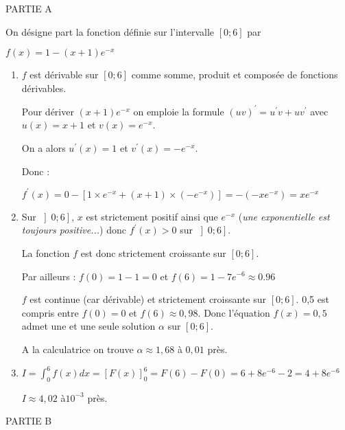\begin{corrige}
     \begin{h3}PARTIE A\end{h3}
     On désigne part la fonction définie sur l'intervalle $\left[0 ; 6\right]$ par
     \par
     $f\left(x\right)=1-\left(x+1\right)e^{- x}$
     \begin{enumerate}
          \item
          $f$ est dérivable sur $\left[0;6\right]$ comme somme, produit et composée de fonctions dérivables.
          \par
          Pour dériver $\left(x+1\right)e^{- x}$ on emploie la formule $\left(uv\right)^{\prime}=u^{\prime}v+uv^{\prime}$ avec $u\left(x\right)=x+1$ et $v\left(x\right)=e^{-x}$.
          \par
          On a alors $u^{\prime}\left(x\right)=1$ et $v^{\prime}\left(x\right)=-e^{-x}$.
          \par
          Donc :
          \par
          $f^{\prime}\left(x\right)=0-\left[1\times e^{-x}+\left(x+1\right)\times \left(-e^{-x}\right)\right]=-\left(-xe^{-x}\right)=xe^{-x}$
          \item
          Sur $\left]0;6\right]$, $x$ est strictement positif ainsi que $e^{-x}$ (\textit{une exponentielle est toujours positive...}) donc $f^{\prime}\left(x\right) > 0$ sur $\left]0;6\right]$.
          \par
          La fonction $f$ est donc strictement croissante sur $\left[0;6\right]$.
          \par
          Par ailleurs : $f\left(0\right)=1-1=0$ et $f\left(6\right)=1-7e^{-6} \approx 0.96$
          \par
          $f$ est continue (car dérivable) et strictement croissante sur $\left[0;6\right]$. 0,5 est compris entre $f\left(0\right)=0$ et $f\left(6\right)\approx 0,98$. Donc l'équation $f\left(x\right)=0,5$ admet une et une seule solution $\alpha $ sur $\left[0;6\right]$.
          \par
          A la calculatrice on trouve $\alpha  \approx 1,68$ à $0,01$ près.
          \item
          $I=\int_{0}^{6} f\left(x\right)dx=\left[F\left(x\right)\right] _{0}^{6}=F\left(6\right)-F\left(0\right)=6+8e^{-6}-2=4+8e^{-6}$
          \par
          $I\approx 4,02$ à$10^{-3}$ près.
     \end{enumerate}
     \begin{h3}PARTIE B\end{h3}

\end{corrige}
